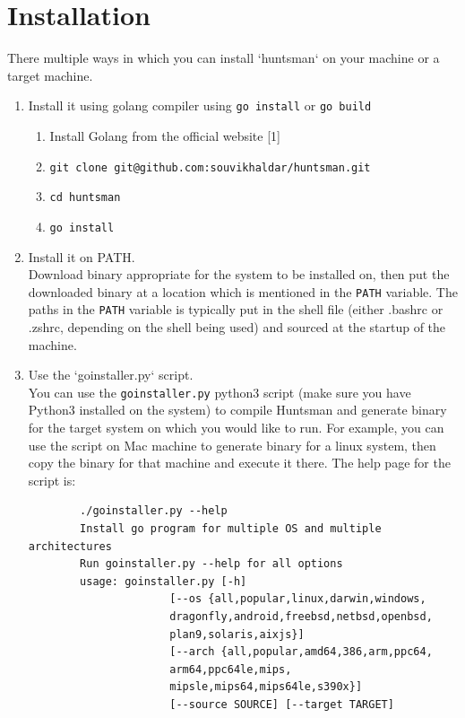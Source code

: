 \documentclass[12pt]{article}
\begin{document}
\section{Installation}
There multiple ways in which you can install `huntsman` on your machine or a target machine.  
\begin{enumerate}
	\item Install it using golang compiler using \verb|go install| or \verb|go build|
	\begin{enumerate}
		\item Install Golang from the official website [1]
		\item \verb|git clone git@github.com:souvikhaldar/huntsman.git|
		\item \verb|cd huntsman|
		\item \verb|go install|
	\end{enumerate}

	\item Install it on PATH.\\
		Download binary appropriate for the system to be installed on, then put the downloaded binary at a location which is mentioned in the \verb|PATH| variable. The paths in the \verb|PATH| variable is typically put in the shell file (either .bashrc or .zshrc, depending on the shell being used) and sourced at the startup of the machine.

	\item Use the `goinstaller.py` script. \\ 
		You can use the \verb|goinstaller.py| python3 script (make sure you have Python3 installed on the system) to compile Huntsman and generate binary for the target system on which you would like to run. For example, you can use the script on Mac machine to generate binary for a linux system, then copy the binary for that machine and execute it there. The help page for the script is:\\
		\begin{verbatim}
		./goinstaller.py --help 
		Install go program for multiple OS and multiple architectures
		Run goinstaller.py --help for all options
		usage: goinstaller.py [-h]
				      [--os {all,popular,linux,darwin,windows,
				      dragonfly,android,freebsd,netbsd,openbsd,
				      plan9,solaris,aixjs}]
				      [--arch {all,popular,amd64,386,arm,ppc64,
				      arm64,ppc64le,mips,
				      mipsle,mips64,mips64le,s390x}]
				      [--source SOURCE] [--target TARGET]


\end{verbatim}
\end{enumerate}
\end{document}
